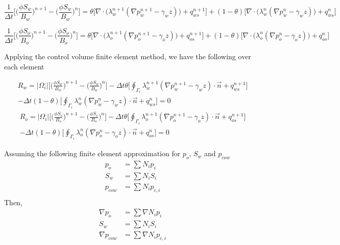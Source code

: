\documentclass[12pt]{article}
\begin{document}
\begin{equation}	\label{w1}
\frac{1}{\Delta t}\Big[\Big(\frac{\phi S_w}{B_w}\Big)^{n+1}-\Big(\frac{\phi S_w}{B_w}\Big)^n\Big] =\theta\Big[ \nabla\cdot\Big(\lambda^{n+1}_w(\nabla p^{n+1}_w-\gamma_wz)\Big)+q^{n+1}_{ws}\Big]+(1-\theta)\Big[\nabla\cdot\Big(\lambda^{n}_w(\nabla p^{n}_w-\gamma_wz)\Big)+q^{n}_{ws}\Big]
\end{equation}


\begin{equation}	\label{o1}
\frac{1}{\Delta t}\Big[\Big(\frac{\phi S_o}{B_o}\Big)^{n+1}-\Big(\frac{\phi S_o}{B_o}\Big)^n\Big] = \theta\Big[ \nabla\cdot\Big(\lambda^{n+1}_o(\nabla p^{n+1}_o-\gamma_oz)\Big)+q^{n+1}_{os}\Big]+(1-\theta)\Big[\nabla\cdot\Big(\lambda^{n}_o(\nabla p^{n}_o-\gamma_oz)\Big)+q^{n}_{os}\Big]\end{equation}

Applying the control volume finite element method, we have the following over each element

\begin{multline}	\label{w2}
R_w = |\Omega_i|\Big[\Big(\frac{\phi S_w}{B_w}\Big)^{n+1}-\Big(\frac{\phi S_w}{B_w}\Big)^n\Big] - \Delta t\theta\Big[\oint_{\Gamma_i}\lambda^{n+1}_w(\nabla p^{n+1}_w-\gamma_wz)\cdot\vec{n}+q^{n+1}_{ws}\Big]	\\
- \Delta t(1-\theta)\Big[\oint_{\Gamma_i}\lambda^{n}_w(\nabla p^{n}_w-\gamma_wz)\cdot\vec{n}+q^{n}_{ws}\Big] = 0
\end{multline}
%
\begin{multline}	\label{o2}
R_o = |\Omega_i|\Big[\Big(\frac{\phi S_o}{B_o}\Big)^{n+1}-\Big(\frac{\phi S_o}{B_o}\Big)^n\Big] - \Delta t\theta\Big[\oint_{\Gamma_i}\lambda^{n+1}_o(\nabla p^{n+1}_o-\gamma_oz)\cdot\vec{n}+q^{n+1}_{os}\Big]	\\
- \Delta t(1-\theta)\Big[\oint_{\Gamma_i}\lambda^{n}_o(\nabla p^{n}_o-\gamma_oz)\cdot\vec{n}+q^{n}_{os}\Big] = 0
\end{multline}

Assuming the following finite element approximation for $p_o$, $S_w$  and $p_{cow}$ 
\begin{equation}
\begin{split}
p_o &= \sum N_ip_{i} \\
S_w &= \sum N_iS_{i} \\
p_{cow} &= \sum N_ip_{c,i} \\
\end{split}
\end{equation}
Then,
\begin{equation}
\begin{split}
\nabla p_o &= \sum \nabla N_ip_{i} \\
S_w &= \sum N_iS_{i} \\
\nabla p_{cow} &= \sum \nabla N_ip_{c,i} \\
\end{split}
\end{equation}
\end{document}
